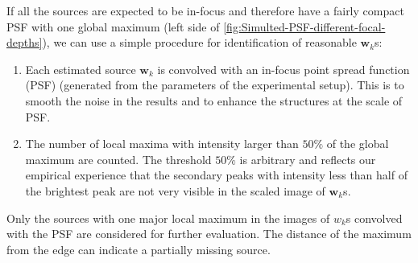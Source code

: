 If all the sources are expected to be in-focus and therefore have a fairly compact PSF with one global maximum (left side of \autoref{fig:Simulted-PSF-different-focal-depths}), we can use a simple procedure for identification of reasonable $\bm{w}_k$s:
%
\begin{enumerate}
	\item
	Each estimated source $\bm{w}_k$ is convolved with an in-focus point spread function (PSF) (generated from the parameters of the experimental setup). This is to smooth the noise in the results and to enhance the structures at the scale of PSF. 
	\item
	The number of local maxima with intensity larger than $50\%$ of the global maximum are counted. The threshold $50\%$ is arbitrary and reflects our empirical experience that the secondary peaks with intensity less than half of the brightest peak are not very visible in the scaled image of $\bm{w}_k$s.
\end{enumerate}

Only the sources with one major local maximum in the images of $w_k$s convolved with the PSF are considered for further evaluation. The distance of the maximum from the edge can indicate a partially missing source. 

